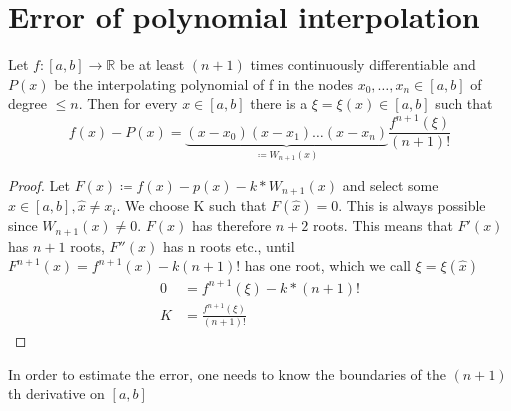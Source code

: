 \section{Error of polynomial interpolation}\label{sec:error-of-polynomial-interpolation}

\begin{theorem}
    Let $f:[a,b] \to \mathbb{R}$ be at least $(n+1)$ times continuously differentiable and $P(x)$ be the interpolating polynomial of f in the nodes
    $x_0, \ldots, x_n \in [a,b]$ of degree $\leq n$. Then for every $x \in [a,b]$ there is a $\xi = \xi(x) \in [a,b]$ such that
    \begin{equation*}
        f(x)-P(x) = \underbrace{(x-x_0)(x-x_1)\ldots(x-x_n)}_{\coloneq W_{n+1}(x)}\frac{f^{n+1}(\xi)}{(n+1)!}
    \end{equation*}
\end{theorem}
\begin{proof}
    Let $F(x) \coloneq f(x)-p(x)-k*W_{n+1}(x)$ and select some $\hat{x}\in [a,b], \hat{x} \neq x_i$.
    We choose K such that $F(\hat{x})=0$.
    This is always possible since $W_{n+1}(x) \neq 0$. $F(x)$ has therefore $n+2$ roots.
    This means that $F'(x)$ has $n+1$ roots, $F''(x)$ has n roots etc., until $F^{n+1}(x)= f^{n+1}(x)-k(n+1)!$ has one root,
    which we call $\xi = \xi(\hat{x})$
    \begin{align*}
        0 &= f^{n+1}(\xi)-k*(n+1)! \\
        K &= \frac{f^{n+1}(\xi)}{(n+1)!}
    \end{align*}
\end{proof}
\begin{remark}
    In order to estimate the error, one needs to know the boundaries of the $(n+1)$th derivative on $[a,b]$
\end{remark}


